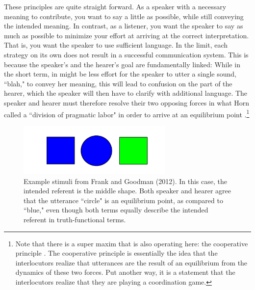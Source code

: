\documentclass[man, noapacite, 12pt]{apa2}
\begin{document}
These principles are quite straight forward. As a speaker with a necessary meaning to contribute, you want to say a little as possible, while still conveying the intended meaning. In contrast, as a listener, you want the speaker to say as much as possible to minimize your effort at arriving at the correct interpretation. That is, you want the speaker to use sufficient language. In the limit, each strategy on its own does not result in a successful communication system. This is because the speaker's and the hearer's goal are fundamentally linked: While in the short term, in might be less effort for the speaker to utter a single sound, ``blah," to convey her meaning, this will lead to confusion on the part of the hearer, which the speaker will then have to clarify with additional language. The speaker and hearer must therefore resolve their two opposing forces  in what Horn called a ``division of pragmatic labor"  in order to arrive at an equilibrium point \cite[p. 22]{horn1984}.\footnote{Note that there is a super maxim that is also operating here: the cooperative principle \cite{horn1984, grice1975logic}. The cooperative principle is essentially the idea that the interlocutors realize that utterances are the result of an equilibrium from the dynamics of these two forces. Put another way, it is a statement that the interlocutors realize that they are playing a coordination game.}

\begin{figure}
\begin{center} 
\includegraphics[width=3in]{figs/frank2012.png}
\caption{\label{fig:frank2012}  Example stimuli from Frank and Goodman (2012). In this case, the intended referent is the middle shape. Both speaker and hearer agree that the utterance ``circle" is  an equilibrium point, as compared to ``blue," even though both terms equally describe the intended referent in truth-functional terms.}
\end{center} 
\end{figure}
\end{document}
